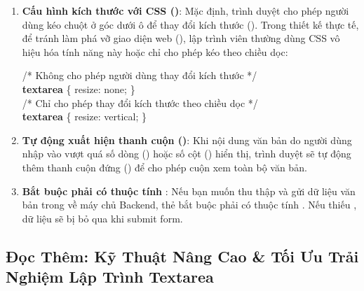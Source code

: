 \begin{warnBox}
\begin{enumerate}[leftmargin=1.5em, itemsep=6pt, parsep=0pt]
    \item \textbf{Cấu hình kích thước với CSS ()}:
    Mặc định, trình duyệt cho phép người dùng kéo chuột ở góc dưới ô để thay đổi kích thước (). Trong thiết kế thực tế, để tránh làm phá vỡ giao diện web (), lập trình viên thường dùng CSS vô hiệu hóa tính năng này hoặc chỉ cho phép kéo theo chiều dọc:
    \par\vspace{4pt}
    \begin{center}
    \begin{tcolorbox}[arc=3pt, colback=white, colframe=primaryBlue!30, boxsep=5pt, left=12pt, right=12pt, top=5pt, bottom=5pt, width=0.85\linewidth]
      \small\ttfamily
      \textcolor{codeComment}{/* Không cho phép người dùng thay đổi kích thước */}\\
      \textcolor{primaryBlue}{\textbf{textarea}} \{ \textcolor{codeComment}{resize}: \textcolor{red!80!black}{none}; \}\\[6pt]
      \textcolor{codeComment}{/* Chỉ cho phép thay đổi kích thước theo chiều dọc */}\\
      \textcolor{primaryBlue}{\textbf{textarea}} \{ \textcolor{codeComment}{resize}: \textcolor{red!80!black}{vertical}; \}
    \end{tcolorbox}
    \end{center}
    \par\vspace{2pt}

    \item \textbf{Tự động xuất hiện thanh cuộn ()}:
    Khi nội dung văn bản do người dùng nhập vào vượt quá số dòng () hoặc số cột () hiển thị, trình duyệt sẽ tự động thêm thanh cuộn đứng () để cho phép cuộn xem toàn bộ văn bản.

    \item \textbf{Bắt buộc phải có thuộc tính }:
    Nếu bạn muốn thu thập và gửi dữ liệu văn bản trong  về máy chủ Backend, thẻ  bắt buộc phải có thuộc tính . Nếu thiếu , dữ liệu sẽ bị bỏ qua khi submit form.
\end{enumerate}
\end{warnBox}

\subsection{Đọc Thêm: Kỹ Thuật Nâng Cao \& Tối Ưu Trải Nghiệm Lập Trình Textarea}

